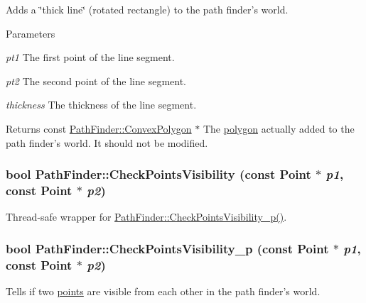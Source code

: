 Adds a \char`\"{}thick line\char`\"{} (rotated rectangle) to the path finder's world. 


\begin{DoxyParams}{Parameters}
\item[{\em pt1}]The first point of the line segment. \item[{\em pt2}]The second point of the line segment. \item[{\em thickness}]The thickness of the line segment. \end{DoxyParams}
\begin{DoxyReturn}{Returns}
const \hyperlink{structPathFinder_1_1ConvexPolygon}{PathFinder::ConvexPolygon} $\ast$ The \hyperlink{structPathFinder_1_1ConvexPolygon}{polygon} actually added to the path finder's world. It should not be modified. 
\end{DoxyReturn}
\hypertarget{classPathFinder_a6d04d3b16677670873ea607c7966f49f}{
\subsubsection[{CheckPointsVisibility}]{\setlength{\rightskip}{0pt plus 5cm}bool PathFinder::CheckPointsVisibility (const {\bf Point} $\ast$ {\em p1}, \/  const {\bf Point} $\ast$ {\em p2})}}
\label{classPathFinder_a6d04d3b16677670873ea607c7966f49f}


Thread-\/safe wrapper for \hyperlink{classPathFinder_a12fb7b7f54766d8bbf5753a5a036a5f0}{PathFinder::CheckPointsVisibility\_\-p()}. 

\hypertarget{classPathFinder_a12fb7b7f54766d8bbf5753a5a036a5f0}{
\subsubsection[{CheckPointsVisibility\_\-p}]{\setlength{\rightskip}{0pt plus 5cm}bool PathFinder::CheckPointsVisibility\_\-p (const {\bf Point} $\ast$ {\em p1}, \/  const {\bf Point} $\ast$ {\em p2})}}
\label{classPathFinder_a12fb7b7f54766d8bbf5753a5a036a5f0}


Tells if two \hyperlink{structPathFinder_1_1Point}{points} are visible from each other in the path finder's world. 


